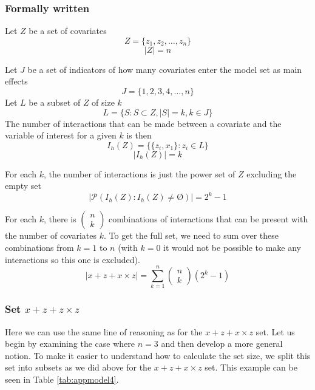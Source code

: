 \subsubsection{Formally written}
Let $Z$ be a set of covariates 
\[Z=\{\left.z_1,z_2,\dots ,z_n\right.\}\] \[|Z|=n\] 

Let $J$ be a set of indicators of how many covariates enter the model set as main effects
\[J=\{\left.1,2,3,4,\dots ,n\right.\}\] 
Let $L$ be a subset of $Z$ of size $k$
\[L=\{\left.S:S\subset Z,\left|S\right|=k,k\in J\right.\}\] 
The number of interactions that can be made between a covariate and the variable of interest for a given $k$ is then
\[I_h\left(Z\right)=\{\{\left.\left.z_i,x_1\right.\}:z_i\in L\right.\}\] 
\[\left|I_h\left(Z\right)\right|=k\] 

For each $k$, the number of interactions is just the power set of $Z$ excluding the empty set
\[\left|\mathcal{P}\left(I_h\left(Z\right):I_h\left(Z\right)\neq \textrm{\O}\right)\right|=2^k-1\] 

For each $k$, there is $\left( \begin{array}{c}
n \\ 
k \end{array}
\right)$ combinations of interactions that can be present with the number of covariates $k$. To get the full set, we need to sum over these combinations from $k=1$ to $n$ (with $k=0$ it would not be possible to make any interactions so this one is excluded).
\[\left|x + z + x \times z\right|=\sum^n_{k=1}{\left( \begin{array}{c}
n \\ 
k \end{array}
\right)\left(2^k-1\right)}\] 

\subsubsection{Set $x + z + z \times z$}
Here we can use the same line of reasoning as for the $x + z + x \times z$ set. Let us begin by examining the case where $n=3$ and then develop a more general notion. To make it easier to understand how to calculate the set size, we split this set into subsets as we did above for the $x + z + x \times z$ set. This example can be seen in Table \ref{tab:appmodel4}. 


